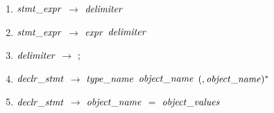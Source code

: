 \begin{enumerate}
\item \noindent ${\it stmt\_expr}$ $\rightarrow$ ${\it delimiter}$\\
 \item  ${\it stmt\_expr}$ $\rightarrow$ ${\it expr}$ ${\it delimiter}$\\
\item ${\it delimiter}$ $\rightarrow$ ${\tt ; }$\\
   \item ${\it declr\_stmt}$ $\rightarrow$ ${\it type\_name}$ ${\it object\_name}$ $({\it , object\_name})^{*}$ \\ 
   \item ${\it declr\_stmt}$ $\rightarrow$ ${\it object\_name}$ $=$ ${\it object\_values}$ \\\\ 



\end{enumerate}
